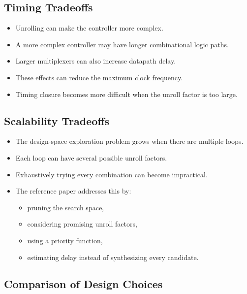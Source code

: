 \documentclass[conference]{IEEEtran}
\begin{document}
\subsection{Timing Tradeoffs}

\begin{itemize}
    \item Unrolling can make the controller more complex.
    \item A more complex controller may have longer combinational logic paths.
    \item Larger multiplexers can also increase datapath delay.
    \item These effects can reduce the maximum clock frequency.
    \item Timing closure becomes more difficult when the unroll factor is too large.
\end{itemize}

\subsection{Scalability Tradeoffs}

\begin{itemize}
    \item The design-space exploration problem grows when there are multiple loops.
    \item Each loop can have several possible unroll factors.
    \item Exhaustively trying every combination can become impractical.
    \item The reference paper addresses this by:
    \begin{itemize}
        \item pruning the search space,
        \item considering promising unroll factors,
        \item using a priority function,
        \item estimating delay instead of synthesizing every candidate.
    \end{itemize}
\end{itemize}

\subsection{Comparison of Design Choices}
\end{document}
